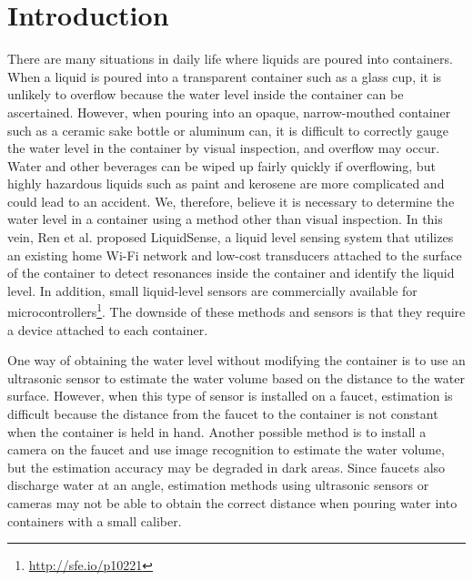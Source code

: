 \documentclass[sigconf,authordraft]{acmart}
\begin{document}
\section{Introduction}
There are many situations in daily life where liquids are poured into containers. When a liquid is poured into a transparent container such as a glass cup, it is unlikely to overflow because the water level inside the container can be ascertained. However, when pouring into an opaque, narrow-mouthed container such as a ceramic sake bottle or aluminum can, it is difficult to correctly gauge the water level in the container by visual inspection, and overflow may occur. Water and other beverages can be wiped up fairly quickly if overflowing, but highly hazardous liquids such as paint and kerosene are more complicated and could lead to an accident. We, therefore, believe it is necessary to determine the water level in a container using a method other than visual inspection. In this vein, Ren et al.\cite{LiquidSense} proposed LiquidSense, a liquid level sensing system that utilizes an existing home Wi-Fi network and low-cost transducers attached to the surface of the container to detect resonances inside the container and identify the liquid level. In addition, small liquid-level sensors are commercially available for microcontrollers\footnote{\url{http://sfe.io/p10221}}. The downside of these methods and sensors is that they require a device attached to each container.\par

One way of obtaining the water level without modifying the container is to use an ultrasonic sensor to estimate the water volume based on the distance to the water surface\cite{smart_faucet1}. However, when this type of sensor is installed on a faucet, estimation is difficult because the distance from the faucet to the container is not constant when the container is held in hand. Another possible method is to install a camera on the faucet and use image recognition to estimate the water volume, but the estimation accuracy may be degraded in dark areas. Since faucets also discharge water at an angle, estimation methods using ultrasonic sensors or cameras may not be able to obtain the correct distance when pouring water into containers with a small caliber.\par
\end{document}

